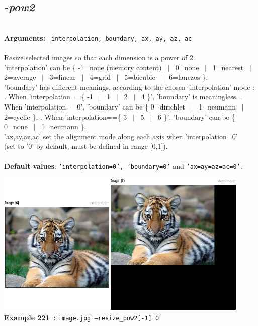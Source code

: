 \documentclass[a4paper,11pt,twoside]{book}
\begin{document}
\subsection{\emph{-pow2} }\vspace*{-0.5em}
~\\\textbf{Arguments: } 
{\small \texttt{\_interpolation,\_boundary,\_ax,\_ay,\_az,\_ac}}\\~\\
Resize selected images so that each dimension is a power of 2.
~\\'interpolation' can be \{ -1=none (memory content) ~$|$~ 0=none ~$|$~ 1=nearest ~$|$~ 2=average ~$|$~ 3=linear ~$|$~ 4=grid ~$|$~ 5=bicubic ~$|$~ 6=lanczos \}.
~\\'boundary' has different meanings, according to the chosen 'interpolation' mode :
. When 'interpolation==\{ -1 ~$|$~ 1 ~$|$~ 2 ~$|$~ 4 \}', 'boundary' is meaningless.
. When 'interpolation==0', 'boundary' can be \{ 0=dirichlet ~$|$~ 1=neumann ~$|$~ 2=cyclic \}.
. When 'interpolation==\{ 3 ~$|$~ 5 ~$|$~ 6 \}', 'boundary' can be \{ 0=none ~$|$~ 1=neumann \}.
~\\'ax,ay,az,ac' set the alignment mode along each axis when 'interpolation=0'
~\\(set to '0' by default, must be defined in range [0,1]).
~\\~\\\textbf{Default values}: {\small \texttt{'interpolation=0', 'boundary=0'} and \texttt{'ax=ay=az=ac=0'.}}
\begin{center}\includegraphics[keepaspectratio=true,height=7cm,width=\textwidth]{img/gmic_def221.jpg}\\
{\footnotesize \textbf{Example 221~:} \texttt{image.jpg --resize\_pow2[-1] 0}}
\end{center}
\end{document}

